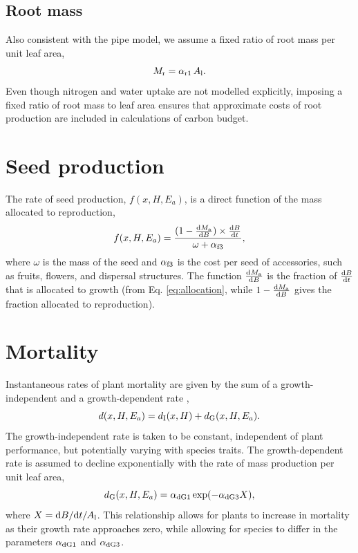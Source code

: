 \documentclass[10pt,twoside]{article}
\begin{document}
\subsection{Root mass}\label{root-mass}

Also consistent with the pipe model, we assume a fixed ratio of
root mass per unit leaf area,
\begin{equation}\label{eq:mr}
M_{\rm r} = \alpha_{{\rm r1}} \, A_{\rm l}.
\end{equation}
Even though nitrogen and water uptake are not modelled explicitly,
imposing a fixed ratio of root mass to leaf area ensures that
approximate costs of root production are included in calculations of
carbon budget.

\section{Seed production}\label{seed-production}

The rate of seed production, \(f(x, H, E_{a})\), is a direct
function of the mass allocated to reproduction,
\begin{equation}\label{eq:fecundity}
f(x, H, E_{a}) = \frac{(1 - \frac{{\rm d}M_{\rm a}}{{\rm d}B}) \times \frac{{\rm d}B}{{\rm d}t}}{
\omega + \alpha_{{\rm f3}}},
\end{equation}
where \(\omega\) is the mass of the seed and \(\alpha_{{\rm f3}}\) is the cost
per seed of accessories, such as fruits, flowers, and dispersal
structures. The function $\frac{{\rm d}M_{\rm a}}{{\rm d}B}$ is the fraction
of $\frac{{\rm d}B}{{\rm d}t}$ that is allocated to growth (from Eq. \ref{eq:allocation}, while
$1-\frac{{\rm d}M_{\rm a}}{{\rm d}B}$ gives the fraction allocated
to reproduction).

\section{Mortality}\label{mortality}

Instantaneous rates of plant mortality are given by the sum of a growth-independent and a growth-dependent rate
\citep{Falster-2011, Moorcroft-2001},
\begin{equation}\label{eq:mortality}
d(x, H, E_{a}) = d_{{\rm I}}(x, H) + d_{{\rm G}}(x, H, E_{a}).
\end{equation}
The growth-independent rate is taken to be constant, independent of
plant performance, but potentially varying with species traits. The
growth-dependent rate is assumed to decline exponentially with the rate
of mass production per unit leaf area,
\begin{equation}\label{eq:mortality_GD}
d_{{\rm G}}(x, H, E_{a}) = \alpha_{{\rm dG1}} \exp(-\alpha_{{\rm dG3}} X),
\end{equation}
where \(X = {\rm d}B/{\rm d}t / A_{\rm l}\). This
relationship allows for plants to increase in mortality as their growth rate
approaches zero, while allowing for species to differ in
the parameters \(\alpha_{{\rm dG1}}\) and \(\alpha_{{\rm dG3}}\).
\end{document}
